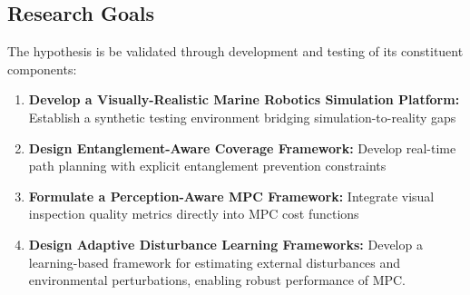 \subsection{Research Goals}
The hypothesis is  be validated through development and testing of its constituent components:



\begin{enumerate}

\item \textbf{Develop a Visually-Realistic Marine Robotics Simulation Platform:}  
Establish a synthetic testing environment bridging simulation-to-reality gaps


\item \textbf{Design Entanglement-Aware Coverage Framework:}  
Develop real-time path planning with explicit entanglement prevention constraints

\item \textbf{Formulate a Perception-Aware \ac{MPC} Framework:}  
Integrate visual inspection quality metrics directly into MPC cost functions


\item \textbf{Design Adaptive Disturbance Learning Frameworks:}  
Develop a learning-based framework for estimating external disturbances and environmental perturbations, enabling robust performance of MPC.

\end{enumerate}


